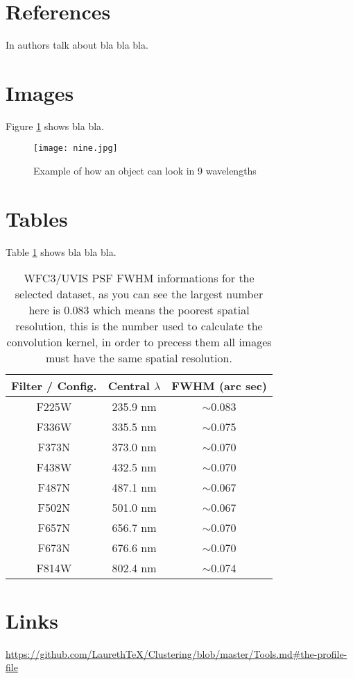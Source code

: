 \section{References}
In \cite{book_key} authors talk about bla bla bla.

\section{Images}
Figure \ref{fig:nine} shows bla bla.

\begin{figure}
	\centering
    \texttt{[image: nine.jpg]}
    \caption{Example of how an object can look in 9 wavelengths}
    \label{fig:nine}
\end{figure}

\section{Tables}
Table \ref{tab:dos} shows bla bla bla.

\begin{table}[h]
    \centering
    \caption{WFC3/UVIS PSF FWHM informations for the selected dataset, as you can see the largest number here is 0.083 which means the poorest spatial resolution, this is the number used to calculate the convolution kernel, in order to precess them all images must have the same spatial resolution.}
    \label{tab:dos}
      \begin{tabular}{ c c c }
      \hline\hline
      
      Filter / Config. & Central $\lambda$ & FWHM (arc sec)\\
      \hline
      F225W & 235.9 nm & $\sim$0.083\\      
      F336W & 335.5 nm & $\sim$0.075\\      
      F373N & 373.0 nm & $\sim$0.070\\
      F438W & 432.5 nm & $\sim$0.070\\
      F487N & 487.1 nm & $\sim$0.067\\
      F502N & 501.0 nm & $\sim$0.067\\
      F657N & 656.7 nm & $\sim$0.070\\
      F673N & 676.6 nm & $\sim$0.070\\
      F814W & 802.4 nm & $\sim$0.074\\
      
      \hline
    \end{tabular}
  \end{table}
  

\section{Links}
\url{https://github.com/LaurethTeX/Clustering/blob/master/Tools.md#the-profile-file}


